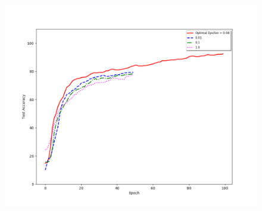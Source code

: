 \documentclass[11pt]{report}
\begin{document}
\begin{itemize}
    \begin{figure}[h]
    	\includegraphics[width = 15 cm]{AdvModel.png}
    	\centering
	\end{figure}

\end{itemize}

	
\end{document}
